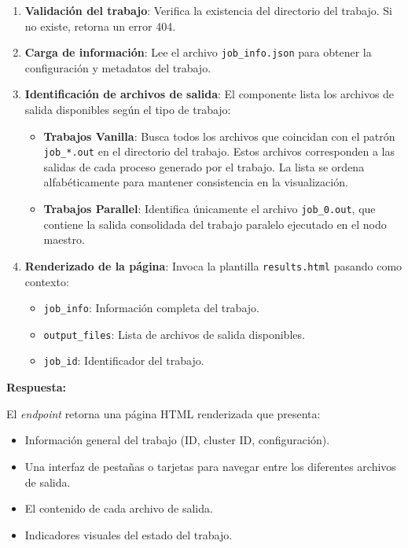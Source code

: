 \begin{enumerate}
	\item \textbf{Validación del trabajo}: Verifica la existencia del directorio del trabajo. Si no existe, retorna un error 404.

	\item \textbf{Carga de información}: Lee el archivo \texttt{job\_info.json} para obtener la configuración y metadatos del trabajo.

	\item \textbf{Identificación de archivos de salida}: El componente lista los archivos de salida disponibles según el tipo de trabajo:

	      \begin{itemize}
		      \item \textbf{Trabajos Vanilla}: Busca todos los archivos que coincidan con el patrón \texttt{job\_*.out} en el directorio del trabajo. Estos archivos corresponden a las salidas de cada proceso generado por el trabajo. La lista se ordena alfabéticamente para mantener consistencia en la visualización.

		      \item \textbf{Trabajos Parallel}: Identifica únicamente el archivo \texttt{job\_0.out}, que contiene la salida consolidada del trabajo paralelo ejecutado en el nodo maestro.
	      \end{itemize}

	\item \textbf{Renderizado de la página}: Invoca la plantilla \texttt{results.html} pasando como contexto:
	      \begin{itemize}
		      \item \texttt{job\_info}: Información completa del trabajo.
		      \item \texttt{output\_files}: Lista de archivos de salida disponibles.
		      \item \texttt{job\_id}: Identificador del trabajo.
	      \end{itemize}
\end{enumerate}

\textbf{Respuesta:}

El \textit{endpoint} retorna una página HTML renderizada que presenta:
\begin{itemize}
	\item Información general del trabajo (ID, cluster ID, configuración).
	\item Una interfaz de pestañas o tarjetas para navegar entre los diferentes archivos de salida.
	\item El contenido de cada archivo de salida.
	\item Indicadores visuales del estado del trabajo.
\end{itemize}


